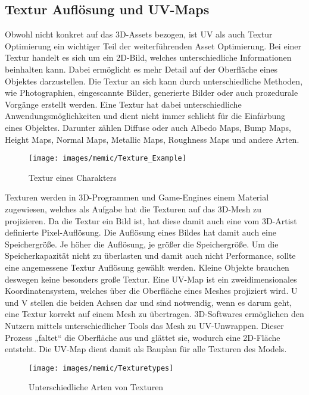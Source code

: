 \subsection{Textur Auflösung und UV-Maps}

Obwohl nicht konkret auf das 3D-Assets bezogen, ist UV als auch Textur Optimierung ein wichtiger Teil der weiterführenden Asset Optimierung. Bei einer Textur handelt es sich um ein 2D-Bild, welches unterschiedliche Informationen beinhalten kann. 
Dabei ermöglicht es mehr Detail auf der Oberfläche eines Objektes darzustellen. Die Textur an sich kann durch unterschiedliche Methoden, wie Photographien, eingescannte Bilder, generierte Bilder oder auch prozedurale Vorgänge erstellt werden. Eine Textur hat dabei unterschiedliche Anwendungsmöglichkeiten und dient nicht immer schlicht für die Einfärbung eines Objektes. Darunter zählen Diffuse oder auch Albedo Maps, Bump Maps, Height Maps, Normal Maps, Metallic Maps, Roughness Maps und andere Arten.\cite[S.18]{_3d_modeling_pipline}

\begin{figure}[H]
	\centering
	\texttt{[image: images/memic/Texture\_Example]}
	\caption{Textur eines Charakters}
\end{figure}
\cite{_textureExample}

Texturen werden in 3D-Programmen und Game-Engines einem Material zugewiesen, welches als Aufgabe hat die Texturen auf das 3D-Mesh zu projizieren. Da die Textur ein Bild ist, hat diese damit auch eine vom 3D-Artist definierte Pixel-Auflösung. Die Auflösung eines Bildes hat damit auch eine Speichergröße. Je höher die Auflösung, je größer die Speichergröße. Um die Speicherkapazität nicht zu überlasten und damit auch nicht Performance, sollte eine angemessene Textur Auflösung gewählt werden.\cite[S.141]{_unity_game_optimization} Kleine Objekte brauchen deswegen keine besonders große Textur.
Eine UV-Map ist ein zweidimensionales Koordinatensystem, welches über die Oberfläche eines Meshes projiziert wird. U und V stellen die beiden Achsen dar und sind notwendig, wenn es darum geht, eine Textur korrekt auf einem Mesh zu übertragen.\cite{_the_complete_guide_to_blender} 3D-Softwares ermöglichen den Nutzern mittels unterschiedlicher Tools das Mesh zu UV-Unwrappen. Dieser Prozess „faltet“ die Oberfläche aus und glättet sie, wodurch eine 2D-Fläche entsteht. Die UV-Map dient damit als Bauplan für alle Texturen des Models.\cite[79]{_3d_game_textures}

\begin{figure}[H]
	\centering
	\texttt{[image: images/memic/Texturetypes]}
	\caption{Unterschiedliche Arten von Texturen}
\end{figure}
\Cite{_textureTypes}

